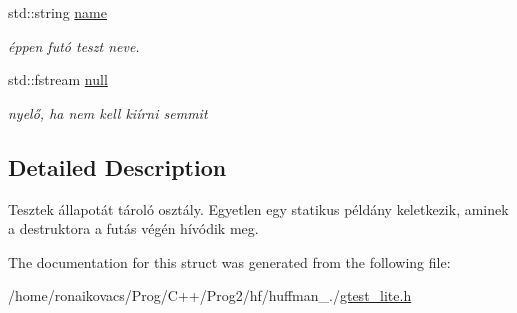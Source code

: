 \begin{DoxyCompactItemize}
\mbox{\label{structgtest__lite_1_1_test_a8d495a42580e3ae337f9c4982136b700}} 
std\+::string \hyperlink{structgtest__lite_1_1_test_a8d495a42580e3ae337f9c4982136b700}{name}
\begin{DoxyCompactList}\small\item\em éppen futó teszt neve. \end{DoxyCompactList}\item 
\mbox{\label{structgtest__lite_1_1_test_af4784302d78bb004bcb20b7f75ec06c3}} 
std\+::fstream \hyperlink{structgtest__lite_1_1_test_af4784302d78bb004bcb20b7f75ec06c3}{null}
\begin{DoxyCompactList}\small\item\em nyelő, ha nem kell kiírni semmit \end{DoxyCompactList}\end{DoxyCompactItemize}


\subsection{Detailed Description}
Tesztek állapotát tároló osztály. Egyetlen egy statikus példány keletkezik, aminek a destruktora a futás végén hívódik meg. 

The documentation for this struct was generated from the following file\+:\begin{DoxyCompactItemize}
\item 
/home/ronaikovacs/\+Prog/\+C++/\+Prog2/hf/huffman\+\_./\hyperlink{gtest__lite_8h}{gtest\+\_\+lite.\+h}\end{DoxyCompactItemize}
